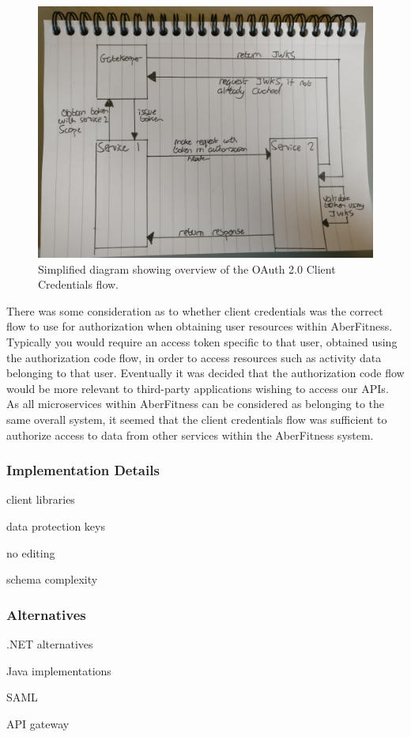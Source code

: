 \begin{figure}[H]
    \centering
    \includegraphics[width=\textwidth]{Images/gatekeeper_clientcredentials_flow.png}
    \caption{Simplified diagram showing overview of the OAuth 2.0 Client Credentials flow.}
\end{figure}

There was some consideration as to whether client credentials was the correct flow to use for authorization when obtaining user resources within AberFitness.  Typically you would require an access token specific to that user, obtained using the authorization code flow, in order to access resources such as activity data belonging to that user.  Eventually it was decided that the authorization code flow would be more relevant to third-party applications wishing to access our APIs.  As all microservices within AberFitness can be considered as belonging to the same overall system, it seemed that the client credentials flow was sufficient to authorize access to data from other services within the AberFitness system.

\subsubsection{Implementation Details}

client libraries

data protection keys

no editing

schema complexity

\subsubsection{Alternatives}

.NET alternatives

Java implementations

SAML

API gateway
